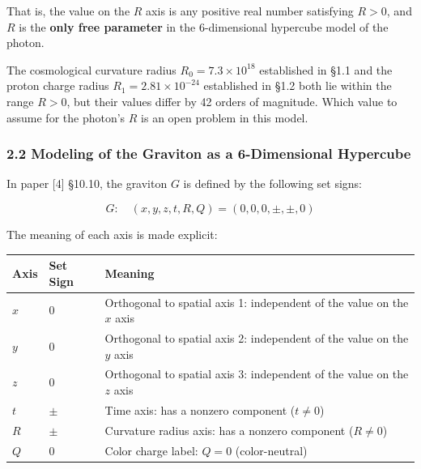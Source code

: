 \documentclass[
  a4paper,11pt]{article}
\newcounter{none}
\theoremstyle{definition}
\theoremstyle{remark}
\begin{document}
That is, the value on the \(R\) axis is any positive real number
satisfying \(R > 0\), and \(R\) is the \textbf{only free parameter} in
the 6-dimensional hypercube model of the photon.

The cosmological curvature radius \(R_0 = 7.3 \times 10^{18}\)
established in §1.1 and the proton charge radius
\(R_1 = 2.81 \times 10^{-24}\) established in §1.2 both lie within the
range \(R > 0\), but their values differ by 42 orders of magnitude.
Which value to assume for the photon's \(R\) is an open problem in this
model.

\subsubsection{2.2 Modeling of the Graviton as a 6-Dimensional
Hypercube}\label{modeling-of-the-graviton-as-a-6-dimensional-hypercube}

In paper {[}4{]} §10.10, the graviton \(G\) is defined by the following
set signs:

\[G: \quad (x, y, z, t, R, Q) = (0, 0, 0, \pm, \pm, 0)\]

The meaning of each axis is made explicit:

{\def\LTcaptype{none} %
\begin{longtable}[]{@{}
  >{\centering\arraybackslash}p{}
  >{\centering\arraybackslash}p{}
  >{\raggedright\arraybackslash}p{}@{}}
\toprule\noalign{}
\begin{minipage}[b]{\linewidth}\centering
Axis
\end{minipage} & \begin{minipage}[b]{\linewidth}\centering
Set Sign
\end{minipage} & \begin{minipage}[b]{\linewidth}\raggedright
Meaning
\end{minipage} \\
\midrule\noalign{}
\endhead
\bottomrule\noalign{}
\endlastfoot
\(x\) & \(0\) & Orthogonal to spatial axis 1: independent of the value
on the \(x\) axis \\
\(y\) & \(0\) & Orthogonal to spatial axis 2: independent of the value
on the \(y\) axis \\
\(z\) & \(0\) & Orthogonal to spatial axis 3: independent of the value
on the \(z\) axis \\
\(t\) & \(\pm\) & Time axis: has a nonzero component (\(t \neq 0\)) \\
\(R\) & \(\pm\) & Curvature radius axis: has a nonzero component
(\(R \neq 0\)) \\
\(Q\) & \(0\) & Color charge label: \(Q = 0\) (color-neutral) \\
\end{longtable}
}
\end{document}
